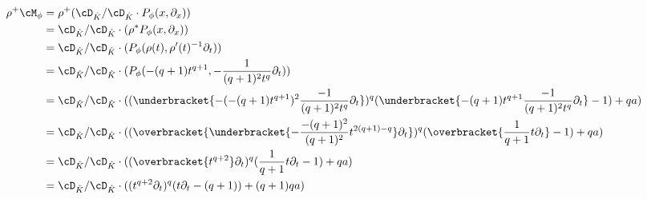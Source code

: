 \begin{align*}
\rho^+\cM_\phi &= \rho^+(\cD_{\hat K}/\cD_{\hat K}\cdot P_\phi(x,\partial_x))\\
  &=\cD_{\hat K}/\cD_{\hat K}\cdot(\rho^*P_\phi(x,\partial_x))\\
  &=\cD_{\hat K}/\cD_{\hat K}\cdot(P_\phi(\rho(t),\rho'(t)^{-1}\partial_t))\\
  &=\cD_{\hat K}/\cD_{\hat K}
    \cdot(P_\phi(-(q+1) t^{q+1},-\frac{1}{(q+1)^2t^q}\partial_t))\\
  &=\cD_{\hat K}/\cD_{\hat K} \cdot
    ((\underbracket{-(-(q+1) t^{q+1})^2\frac{-1}{(q+1)^2t^{q}}\partial_t})^{q}
    (\underbracket{-(q+1) t^{q+1}\frac{-1}{(q+1)^2t^{q}}\partial_t}-1)+qa)\\
  &=\cD_{\hat K}/\cD_{\hat K}
    \cdot((\overbracket{
      \underbracket{-\frac{-(q+1)^2}{(q+1)^2}t^{2(q+1)-q}}\partial_t})^{q}
    (\overbracket{\frac{1}{q+1}t\partial_t}-1)+qa)\\
  &=\cD_{\hat K}/\cD_{\hat K}
    \cdot((\overbracket{t^{q+2}}\partial_t)^{q}
    (\frac{1}{q+1}t\partial_t-1)+qa)\\
  &=\cD_{\hat K}/\cD_{\hat K}
    \cdot((t^{q+2}\partial_t)^{q}
    (t\partial_t-(q+1))+(q+1)qa)
\end{align*}
\begin{comment}
Bei \cite{sabbah_Fourier-local}:\\
Sei $\rho:t\mapsto x:=-\frac{t^{q+1}}{qa}$ so ist
\begin{align*}
\rho^+\cM_\phi &= \rho^+(\cD_{\hat K}/\cD_{\hat K}\cdot P_\phi(x,\partial_x))\\
  &=\cD_{\hat K}/\cD_{\hat K}\cdot(\rho^*P_\phi(x,\partial_x))\\
  &=\cD_{\hat K}/\cD_{\hat K}\cdot(P_\phi(\rho(t),\rho'(t)^{-1}\partial_t))\\
  &=\cD_{\hat K}/\cD_{\hat K}
    \cdot(P_\phi(-\frac{t^{q+1}}{qa}, -\frac{qa}{(q+1)t^q}\partial_t))
\end{align*}
mit
\begin{align*}
P_\phi(-\frac{t^{q+1}}{qa}, -\frac{qa}{(q+1)t^q}\partial_t)
  &= (-(-\frac{t^{q+1}}{qa})^2(-\frac{qa}{(q+1)t^q}\partial_t))^q
    (-\frac{t^{q+1}}{qa}(-\frac{qa}{(q+1)t^q}\partial_t)-1)+qa\\
  &= ((\frac{t^{q+1}}{qa})^2\frac{qa}{(q+1)t^q}\partial_t)^q
    (\frac{t^{q+1}}{qa}\frac{qa}{(q+1)t^q}\partial_t-1)+qa\\
  &= (\frac{(t^{q+1})^2}{qa(q+1)t^q}\partial_t)^q
    (\frac{t^{q+1}}{(q+1)t^q}\partial_t-1)+qa\\
  &= (\frac{t^{2q+2-q}}{qa(q+1)}\partial_t)^q
    (\frac{t^{q+1-q}}{(q+1)}\partial_t-1)+qa\\
  &= (\frac{t^{q+2}}{qa(q+1)}\partial_t)^q
    (\frac{1}{(q+1)}t\partial_t-1)+qa\\
\end{align*}
\end{comment}
